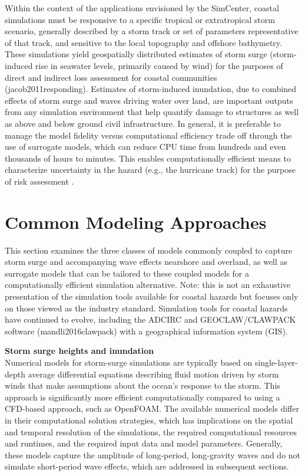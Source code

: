 Within the context of the applications envisioned by the SimCenter, coastal simulations must be responsive to a specific tropical or extratropical storm scenario, generally described by a storm track or set of parameters representative of that track, and sensitive to the local topography and offshore bathymetry. These simulations yield geospatially distributed estimates of storm surge (storm-induced rise in seawater levels, primarily caused by wind) for the purposes of direct and indirect loss assessment for coastal communities (jacob2011responding). Estimates of storm-induced inundation, due to combined effects of storm surge and waves driving water over land, are important outputs from any simulation environment that help quantify damage to structures as well as above and below ground civil infrastructure.
In general, it is preferable to manage the model fidelity versus computational efficiency trade off through the use of surrogate models, which can reduce CPU time from hundreds and even thousands of hours to minutes. This enables computationally efficient means to characterize uncertainty in the hazard (e.g., the hurricane track) for the purpose of risk assessment \citep{kijewski-correa2014cybereye}.

\section{Common Modeling Approaches}
\label{sec:storm_surge_methods}

This section examines the three classes of models commonly coupled to capture storm surge and accompanying wave effects nearshore and overland, as well as surrogate models that can be tailored to these coupled models for a computationally efficient simulation alternative. Note: this is not an exhaustive presentation of the simulation tools available for coastal hazards but focuses only on those viewed as the industry standard. Simulation tools for coastal hazards have continued to evolve, including the ADCIRC \citep{adcirc_web} and GEOCLAW/CLAWPACK software (mandli2016clawpack) with a geographical information system (GIS).
\newline

\noindent\textbf{Storm surge heights and inundation} \\Numerical models for storm-surge simulations are typically based on single-layer-depth average differential equations describing fluid motion driven by storm winds that make assumptions about the ocean’s response to the storm. This approach is significantly more efficient computationally compared to using a CFD-based approach, such as OpenFOAM. The available numerical models differ in their computational solution strategies, which has implications on the spatial and temporal resolution of the simulations, the required computational resources and runtimes, and the required input data and model parameters. Generally, these models capture the amplitude of long-period, long-gravity waves and do not simulate short-period wave effects, which are addressed in subsequent sections.

